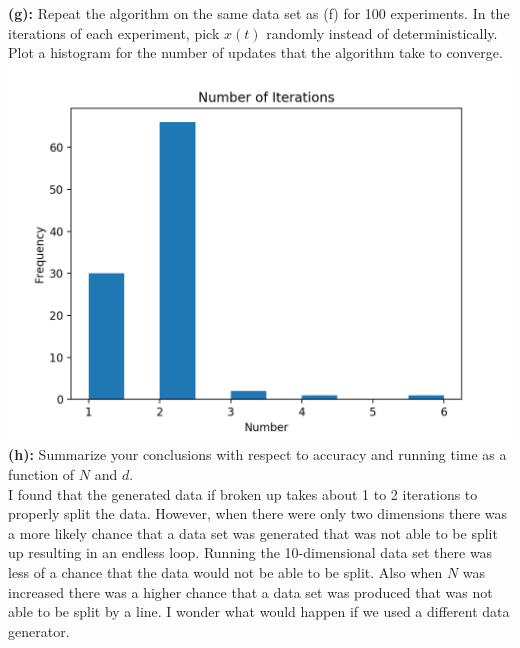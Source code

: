 \documentclass[a4paper]{article}
\begin{document}
\indent \textbf{(g):} Repeat the algorithm on the same data set as (f)
for 100 experiments. In the iterations of each experiment, pick 
$x(t)$ randomly instead of deterministically. Plot a histogram
for the number of updates that the algorithm take to converge. \\ 
\includegraphics[width=150mm]{g.png} \\



\indent \textbf{(h):} Summarize your conclusions with respect to 
accuracy and running time as a function of $N$ and $d$. \\

I found that the generated data if broken up takes about 1 to 
2 iterations to properly split the data. However, 
when there were only two dimensions there was a more 
likely chance that a data set was generated that was not 
able to be split up resulting in an endless loop. 
Running the 10-dimensional data set there was less of a 
chance that the data would not be able to be split. 
Also when $N$ was increased there was a higher chance 
that a data set was produced that was not able to be split 
by a line. I wonder what would happen if we used a 
different data generator. 
\end{document}
